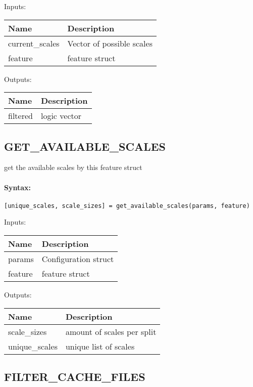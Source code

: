 \bigskip
Inputs:

\begin{tabular}{|p{}|p{}|}
\hline
\textbf{Name} & \textbf{Description} \\
\hline \hline
current\_scales & Vector of possible scales  \\ \hline
feature & feature struct  \\ \hline
\end{tabular}

\bigskip
Outputs:

\begin{tabular}{|p{}|p{}|}
\hline
\textbf{Name} & \textbf{Description} \\
\hline \hline
filtered & logic vector  \\ \hline
\end{tabular}

\subsection{GET\_AVAILABLE\_SCALES}

get the available scales by this feature struct

\paragraph{Syntax:} \verb|[unique_scales, scale_sizes] = get_available_scales(params, feature)|

\bigskip
Inputs:

\begin{tabular}{|p{}|p{}|}
\hline
\textbf{Name} & \textbf{Description} \\
\hline \hline
params & Configuration struct  \\ \hline
feature & feature struct  \\ \hline
\end{tabular}

\bigskip
Outputs:

\begin{tabular}{|p{}|p{}|}
\hline
\textbf{Name} & \textbf{Description} \\
\hline \hline
scale\_sizes & amount of scales per split  \\ \hline
unique\_scales & unique list of scales  \\ \hline
\end{tabular}

\subsection{FILTER\_CACHE\_FILES}

